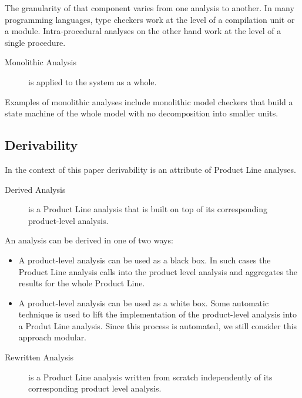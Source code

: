 \documentclass[sigplan]{acmart}
\begin{document}
The granularity of that component varies from one analysis to another. In many programming languages, type checkers work at the level of a compilation unit or a module. Intra-procedural analyses on the other hand work at the level of a single procedure. 

\begin{description}
\item [Monolithic Analysis]
is applied to the system as a whole. 
\end{description}

Examples of monolithic analyses include monolithic model checkers that build a state machine of the whole model with no decomposition into smaller units.

\subsection{Derivability}

In the context of this paper derivability is an attribute of Product Line analyses.

\begin{description}
\item [Derived Analysis]
is a  Product Line analysis that is built on top of its corresponding product-level analysis. 
\end{description}

An analysis can be derived in one of two ways:

\begin{itemize}

\item A product-level analysis can be used as a black box. In such cases the Product Line analysis calls into the product level analysis and aggregates the results for the whole Product Line.

\item A product-level analysis can be used as a white box. Some automatic technique is used to lift the implementation of the product-level analysis into a Produt Line analysis. Since this process is automated, we still consider this approach modular.
\end{itemize}

\begin{description}

\item [Rewritten Analysis]
is a Product Line analysis written from scratch independently of its corresponding product level analysis.
\end{description}
\end{document}
